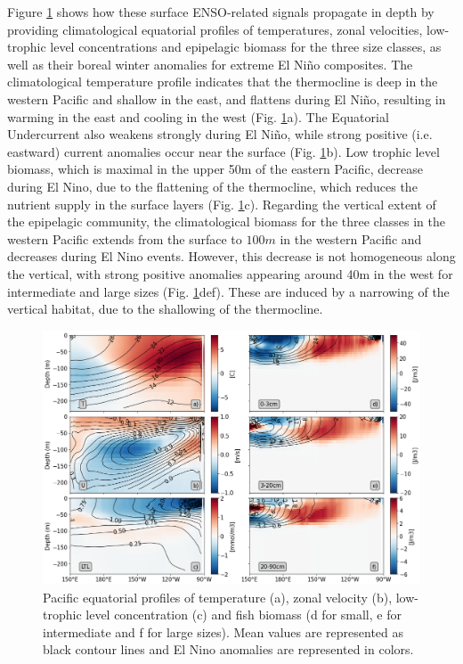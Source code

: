 Figure \ref{fig:profiles} shows how these surface ENSO-related signals propagate in depth by providing climatological equatorial profiles of temperatures, zonal velocities, low-trophic level concentrations and  epipelagic biomass for the three size classes, as well as their boreal winter anomalies for extreme El Niño composites. The climatological temperature profile indicates that the thermocline is deep in the western Pacific and shallow in the east, and flattens during El Niño, resulting in warming in the east and cooling in the west (Fig. \ref{fig:profiles}a). The Equatorial Undercurrent also weakens strongly during El Niño, while strong positive (i.e. eastward) current anomalies occur near the surface (Fig. \ref{fig:profiles}b). Low trophic level biomass, which is maximal in the upper 50m of the eastern Pacific, decrease during El Nino, due to the flattening of the thermocline, which reduces the nutrient supply in the surface layers (Fig. \ref{fig:profiles}c). Regarding the vertical extent of the epipelagic community, the climatological biomass for the three classes in the western Pacific extends from the surface to $100m$ in the western Pacific and decreases during El Nino events. However, this decrease is not homogeneous along the vertical, with strong positive anomalies appearing around 40m in the west for intermediate and large sizes (Fig. \ref{fig:profiles}def). These are induced by a narrowing of the vertical habitat, due to the shallowing of the thermocline. 

\begin{figure}[h!tp]
	\centering
	\includegraphics[scale=0.4]{figs/forage_mean_ond97.png}	
	\caption{Pacific equatorial profiles of temperature (a), zonal velocity (b), low-trophic level concentration (c) and fish biomass (d for small, e for intermediate and f for large sizes). Mean values are represented as black contour lines and El Nino anomalies are represented in colors.}	
	\label{fig:profiles}
\end{figure}

